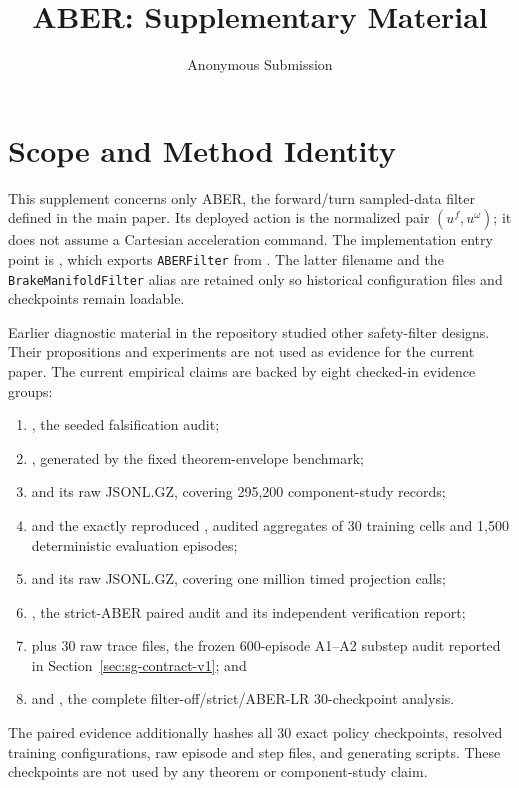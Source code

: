 \documentclass[letterpaper]{article}
\title{ABER: Supplementary Material}
\author{Anonymous Submission}
\begin{document}
\maketitle

\section{Scope and Method Identity}

This supplement concerns only ABER, the forward/turn sampled-data filter
defined in the main paper.  Its deployed action is the normalized pair
$(u^f,u^\omega)$; it does not assume a Cartesian acceleration command.
The implementation entry point is
, which exports \texttt{ABERFilter} from
.  The latter filename and the
\texttt{BrakeManifoldFilter} alias are retained only so historical
configuration files and checkpoints remain loadable.

Earlier diagnostic material in the repository studied other safety-filter
designs.  Their propositions and experiments are not used as evidence for the
current paper.  The current empirical claims are backed by eight checked-in
evidence groups:
\begin{enumerate}
\item {}, the seeded falsification audit;
\item {}, generated by the
fixed theorem-envelope benchmark;
\item {} and its raw JSONL.GZ,
covering 295,200 component-study records;
\item {} and the exactly reproduced
, audited aggregates of 30
training cells and 1,500 deterministic evaluation episodes;
\item {} and its raw JSONL.GZ, covering
one million timed projection calls;
\item {}, the strict-ABER paired audit and
its independent verification report;
\item {} plus 30 raw trace files,
the frozen 600-episode A1--A2 substep audit reported in
Section~\ref{sec:sg-contract-v1}; and
\item {} and
, the complete filter-off/strict/ABER-LR
30-checkpoint analysis.
\end{enumerate}
The paired evidence additionally hashes all 30 exact policy checkpoints,
resolved training configurations, raw episode and step files, and generating
scripts.  These checkpoints are not used by any theorem or component-study
claim.
\end{document}
